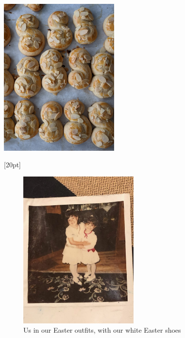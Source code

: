 \begin{marginfigure}
  \includegraphics[width=60mm]{monanteras/images/Easter koulourakia.jpg}
\end{marginfigure}[20pt]

\begin{figure}
  \includegraphics[width=60mm]{monanteras/images/IMG_20241009_171710.jpg}
  \caption{Us in our Easter outfits, with our white Easter shoes}
\end{figure}